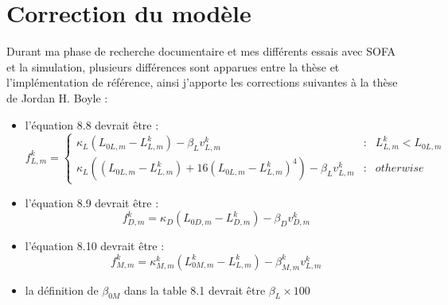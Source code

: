 \cleardoublepage
\chapter{Correction du modèle} %
\label{cha:Correction du modèle}

Durant ma phase de recherche documentaire et mes différents essais avec
SOFA et la simulation, plusieurs différences sont apparues entre la thèse
et l'implémentation de référence, ainsi j'apporte les corrections suivantes
à la thèse de Jordan H. Boyle \cite{Boyle2009} :
\begin{itemize}
   \item l'équation 8.8 devrait être :
      \begin{equation}
      f^k_{L,m} = \left\{ 
         \begin{array}{rcl}
            \kappa_L(L_{0L,m} - L_{L,m}^k) - \beta_{L}v_{L,m}^k & : & L_{L,m}^k < L_{0L,m}\\
            \kappa_L((L_{0L,m} - L_{L,m}^k) + 16(L_{0L,m} - L_{L,m}^k)^4) - \beta_{L}v_{L,m}^k & : & otherwise
         \end{array}
         \right.
      \end{equation}
   \item l'équation 8.9 devrait être :
      \begin{equation}
      f_{D,m}^k = \kappa_D(L_{0D,m} - L_{D,m}^k) - \beta_{D}v_{D,m}^k
      \end{equation}
   \item l'équation 8.10 devrait être :
      \begin{equation}
      f_{M,m}^k = \kappa_{M,m}^k(L_{0M,m}^k - L_{L,m}^k) - \beta_{M,m}^{k}v_{L,m}^k
      \end{equation}
   \item la définition de $\beta_{0M}$ dans la table 8.1 devrait être $\beta_L \times 100$
\end{itemize}



